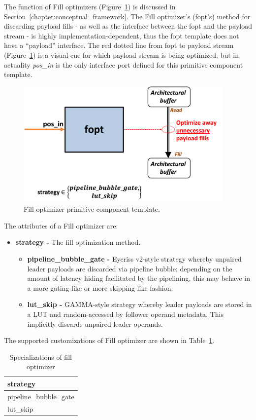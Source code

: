 The function of Fill optimizers (Figure~\ref{fig:fopt}) is discussed in Section~\ref{chapter:conceptual_framework}. The Fill optimizer's (fopt's) method for discarding payload fills - as well as the interface between the fopt and the payload stream - is highly implementation-dependent, thus the fopt template does not have a ``payload'' interface. The red dotted line from fopt to payload stream (Figure~\ref{fig:fopt}) is a visual cue for which payload stream is being optimized, but in actuality \textit{pos\_in} is the only interface port defined for this primitive component template.

\begin{figure}[H]
    \centering
    \includegraphics[width=0.95\textwidth]{figures/fopt.png}
    \caption{Fill optimizer primitive component template. }
    \label{fig:fopt}
\end{figure}

The attributes of a Fill optimizer are:

\begin{itemize}
    \item \textbf{strategy -} The fill optimization method.
    \begin{itemize}
    \item \textbf{pipeline\_bubble\_gate -} Eyeriss v2-style\cite{eyerissv2} strategy whereby unpaired leader payloads are discarded via pipeline bubble; depending on the amount of latency hiding facilitated by the pipelining, this may behave in a more gating-like or more skipping-like fashion.
    \item \textbf{lut\_skip -} GAMMA-style\cite{gamma} strategy whereby leader payloads are stored in a LUT and random-accessed by follower operand metadata. This implicitly discards unpaired leader operands.
    \end{itemize}
\end{itemize}

The supported customizations of Fill optimizer are shown in Table~\ref{tab:FillOptimizer_specializations}.

\begin{table}[H]
\centering
\begin{tabular}{l}
\toprule
 strategy             \\
\midrule
 pipeline\_bubble\_gate \\
 lut\_skip             \\
\bottomrule
\end{tabular}
\caption{Specializations of fill optimizer}
\label{tab:FillOptimizer_specializations}
\end{table}